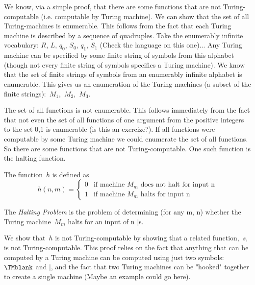 \documentclass[../../include/open-logic-section]{subfiles}
\begin{document}

\begin{explain}
We know, via a simple proof, that there are some functions that are not Turing-computable (i.e. computable by Turing machine).
We can show that the set of all Turing-machines is enumerable. This follows from the fact that each Turing machine is described by a sequence of quadruples. Take the enumerably infinite vocabulary: $R$, $L$, $q_0$, $S_0$, $q_1$, $S_1$ (Check the language on this one)... Any Turing machine can be specified by some finite string of symbols from this alphabet (though not every finite string of symbols specifies a Turing machine). We know that the set of finite strings of symbols from an enumerably infinite alphabet is enumerable. This gives us an enumeration of the Turing machines (a subset of the finite strings):~$M_1$,~$M_2$,~$M_3$.

The set of all functions is not enumerable. This follows immediately from the fact that not even the set of all functions of one argument from the positive integers to the set {0,1} is enumerable (is this an exercize?). If all functions were computable by some Turing machine we could enumerate the set of all functions. So there are some functions that are not Turing-computable. One such function is the halting function.
\end{explain}

\begin{defn} The function~$h$ is defined as
\[
h(n,m) =
\begin{cases}
  \text{0} & \text{if machine~$M_m$ does not halt for input n} \\
  \text{1} & \text{if machine~$M_m$ halts for input n}
\end{cases}
\]
\end{defn}

\begin{defn}
The \emph{Halting Problem} is the problem of determining (for any m, n) whether the Turing machine~$M_m$ halts for an input of n $\mid$s.
\end{defn}

\begin{explain}
We show that~$h$ is not Turing-computable by showing that a related function,~$s$, is not Turing-computable. This proof relies on the fact that anything that can be computed by a Turing machine can be computed using just two symbols: $\TMblank$ and $\mid$, and the fact that two Turing machines can be "hooked" together to create a single machine (Maybe an example could go here).
\end{explain}
\end{document}
